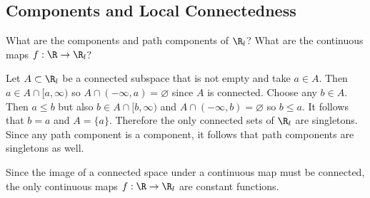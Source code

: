 \subsection{Components and Local Connectedness}
\begin{ex}{25.1}
    What are the components and path components of $\R_l$? What are the continuous maps $f:\R\to\R_l$?
\end{ex}
\begin{sol}
    Let $A\subset\R_l$ be a connected subspace that is not empty and take $a\in A$. 
    Then $a\in A\cap [a,\infty)$ so $A\cap (-\infty, a)=\varnothing$ since $A$ is connected. 
    Choose any $b\in A$. Then $a\leq b$ but also $b\in A\cap [b,\infty)$ and $A\cap(-\infty, b)=\varnothing$ so $b\leq a$.
    It follows that $b=a$ and $A=\{a\}$. Therefore the only connected sets of $\R_l$ are singletons.
    Since any path component is a component, it follows that path components are singletons as well.

    Since the image of a connected space under a continuous map must be connected, the only continuous maps $f:\R\to\R_l$ are  constant functions.
\end{sol}

\begin{ex}{25.5}
    
\end{ex}